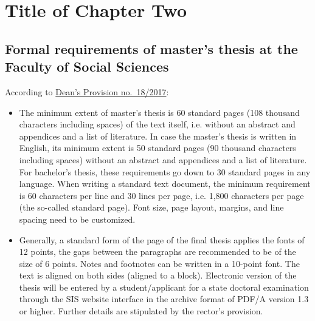 \chapter{Title of Chapter Two}
\label{chap:two}


\section{Formal requirements of master's thesis at the Faculty of Social Sciences}
\label{sec:formal}

According to \href{https://www.fsv.cuni.cz/deans-provision-no-182017}{Dean's Provision no.\ 18/2017}:
\begin{itemize}
		\item  The minimum extent of master's thesis is 60 standard pages (108 thousand characters including spaces) of the text itself, i.e. without an abstract and appendices and a list of literature. In case the master's thesis is written in English, its minimum extent is 50 standard pages (90 thousand characters including spaces) without an abstract and appendices and a list of literature. For bachelor's thesis, these requirements go down to 30 standard pages in any language. When writing a standard text document, the minimum requirement is 60 characters per line and 30 lines per page, i.e. 1,800 characters per page (the so-called standard page). Font size, page layout, margins, and line spacing need to be customized.
		\item Generally, a standard form of the page of the final thesis applies the fonts of 12 points, the gaps between the paragraphs are recommended to be of the size of 6 points. Notes and footnotes can be written in a 10-point font. The text is aligned on both sides (aligned to a block). Electronic version of the thesis will be entered by a student/applicant for a state doctoral examination through the SIS website interface in the archive format of PDF/A version 1.3 or higher. Further details are stipulated by the rector's provision.
\end{itemize}





